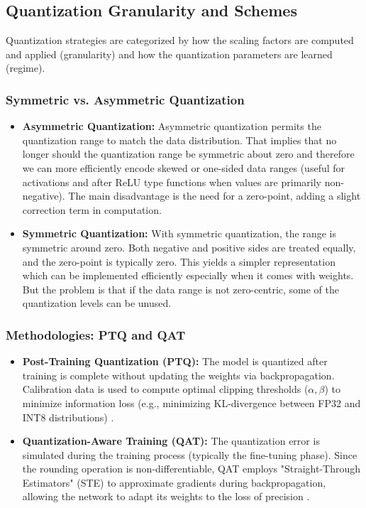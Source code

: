 \subsection{Quantization Granularity and Schemes}

Quantization strategies are categorized by how the scaling factors are computed and applied (granularity) and how the quantization parameters are learned (regime).

\subsubsection{Symmetric vs. Asymmetric Quantization}
\label{subsec:sym_asym}
\begin{itemize}
    \item \textbf{Asymmetric Quantization:}
Asymmetric quantization permits the quantization range to match the data distribution. That implies that no longer should the quantization range be symmetric about zero and therefore we can more efficiently encode skewed or one-sided data ranges (useful for activations and after ReLU type functions when values are primarily non-negative). The main disadvantage is the need for a zero-point, adding a slight correction term in computation.

    \item \textbf{Symmetric Quantization:}
With symmetric quantization, the range is symmetric around zero. Both negative and positive sides are treated equally, and the zero-point is typically zero. This yields a simpler representation which can be implemented efficiently especially when it comes with weights. But the problem is that if the data range is not zero-centric, some of the quantization levels can be unused.
\end{itemize}

\subsubsection{Methodologies: PTQ and QAT}
\begin{itemize}
    \item \textbf{Post-Training Quantization (PTQ):} The model is quantized after training is complete without updating the weights via backpropagation. Calibration data is used to compute optimal clipping thresholds ($\alpha, \beta$) to minimize information loss (e.g., minimizing KL-divergence between FP32 and INT8 distributions) \cite{liu-etal-2023-llm}.
    \item \textbf{Quantization-Aware Training (QAT):} The quantization error is simulated during the training process (typically the fine-tuning phase). Since the rounding operation is non-differentiable, QAT employs "Straight-Through Estimators" (STE) to approximate gradients during backpropagation, allowing the network to adapt its weights to the loss of precision \cite{jacob2018quantization}.
\end{itemize}

